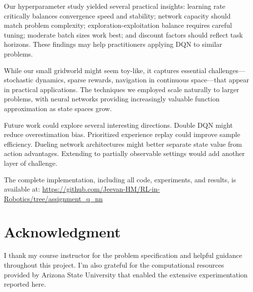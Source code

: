\documentclass[conference]{IEEEtran}
\begin{document}
Our hyperparameter study yielded several practical insights: learning rate critically balances convergence speed and stability; network capacity should match problem complexity; exploration-exploitation balance requires careful tuning; moderate batch sizes work best; and discount factors should reflect task horizons. These findings may help practitioners applying DQN to similar problems.

While our small gridworld might seem toy-like, it captures essential challenges—stochastic dynamics, sparse rewards, navigation in continuous space—that appear in practical applications. The techniques we employed scale naturally to larger problems, with neural networks providing increasingly valuable function approximation as state spaces grow.

Future work could explore several interesting directions. Double DQN \cite{van2016deep} might reduce overestimation bias. Prioritized experience replay \cite{schaul2015prioritized} could improve sample efficiency. Dueling network architectures \cite{wang2016dueling} might better separate state value from action advantages. Extending to partially observable settings would add another layer of challenge.

The complete implementation, including all code, experiments, and results, is available at: \href{https://github.com/Jeevan-HM/RL-in-Robotics/tree/assignment_q_nn}{https://github.com/Jeevan-HM/RL-in-Robotics/tree/assignment\_q\_nn}

\section*{Acknowledgment}

I thank my course instructor for the problem specification and helpful guidance throughout this project. I'm also grateful for the computational resources provided by Arizona State University that enabled the extensive experimentation reported here.
\end{document}
